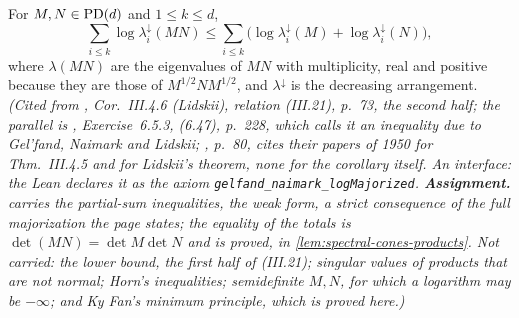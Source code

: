 \begin{theorem}
\label{thm:cited-A9}
\leanok
For $M, N \in \mathrm{PD}(d)$ and $1 \le k \le d$,
\[
  \sum_{i \le k}\log\lambda^\downarrow_i(MN) \le \sum_{i \le k}\bigl(\log\lambda^\downarrow_i(M) +
  \log\lambda^\downarrow_i(N)\bigr) ,
\]
where $\lambda(MN)$ are the eigenvalues of $MN$ with multiplicity, real and positive because they
are those of $M^{1/2}NM^{1/2}$, and $\lambda^\downarrow$ is the decreasing arrangement.
\statusA\quad{}\quad\emph{(Cited from , Cor.~III.4.6 (Lidskii),
relation (III.21), p.~73, the second half; the parallel is ,
Exercise~6.5.3, (6.47), p.~228, which calls it an inequality due to Gel'fand, Naimark and Lidskii;
, p.~80, cites their papers of 1950 for Thm.~III.4.5 and for Lidskii's
theorem, none for the corollary itself. An interface: the Lean declares it as the axiom
\texttt{gelfand\_naimark\_logMajorized}. \textbf{Assignment.}  carries the partial-sum
inequalities, the weak form, a strict consequence of the full majorization the page states; the
equality of the totals is $\det(MN) = \det M\det N$ and is proved, in
\ref{lem:spectral-cones-products}. Not carried: the lower bound, the first half of (III.21); singular
values of products that are not normal; Horn's inequalities; semidefinite $M, N$, for which a
logarithm may be $-\infty$; and Ky Fan's minimum principle, which is proved here.)}
\end{theorem}

